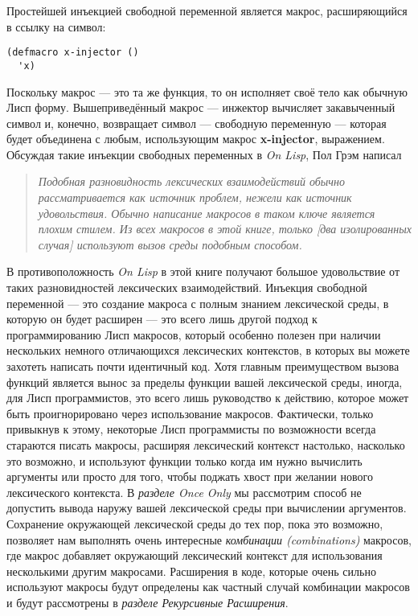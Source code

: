 Простейшей инъекцией свободной переменной является макрос, расширяющийся в ссылку на символ:

\begin{verbatim}
(defmacro x-injector ()
  'x)
\end{verbatim}

Поскольку макрос --- это та же функция, то он исполняет своё тело как обычную Лисп форму. Вышеприведённый макрос --- инжектор вычисляет закавыченный символ и, конечно, возвращает символ --- свободную переменную --- которая будет объединена с любым, использующим макрос \textbf{x-injector}, выражением. Обсуждая такие инъекции свободных переменных в \emph{On Lisp}, Пол Грэм написал

\begin{quote}
\emph{Подобная разновидность лексических взаимодействий обычно рассматривается как источник проблем, нежели как источник удовольствия. Обычно написание макросов в таком ключе является плохим стилем. Из всех макросов в этой книге, только [два изолированных случая] используют вызов среды подобным способом.}
\end{quote}

В противоположность \emph{On Lisp} в этой книге получают большое удовольствие от таких разновидностей лексических взаимодействий. Инъекция свободной переменной --- это создание макроса с полным знанием лексической среды, в которую он будет расширен --- это всего лишь другой подход к программированию Лисп макросов, который особенно полезен при наличии нескольких немного отличающихся лексических контекстов, в которых вы можете захотеть написать почти идентичный код. Хотя главным преимуществом вызова функций является вынос за пределы функции вашей лексической среды, иногда, для Лисп программистов, это всего лишь руководство к действию, которое может быть проигнорировано через использование макросов. Фактически, только привыкнув к этому, некоторые Лисп программисты по возможности всегда стараются писать макросы, расширяя лексический контекст настолько, насколько это возможно, и используют функции только когда им нужно вычислить аргументы или просто для того, чтобы поджать хвост при желании нового лексического контекста. В \emph{разделе Once Only} мы рассмотрим способ не допустить вывода наружу вашей лексической среды при вычислении аргументов. Сохранение окружающей лексической среды до тех пор, пока это возможно, позволяет нам выполнять очень интересные \emph{комбинации (combinations)} макросов, где макрос добавляет окружающий лексический контекст для использования несколькими другим макросами. Расширения в коде, которые очень сильно используют макросы будут определены как частный случай комбинации макросов и будут рассмотрены в \emph{разделе Рекурсивные Расширения}.

